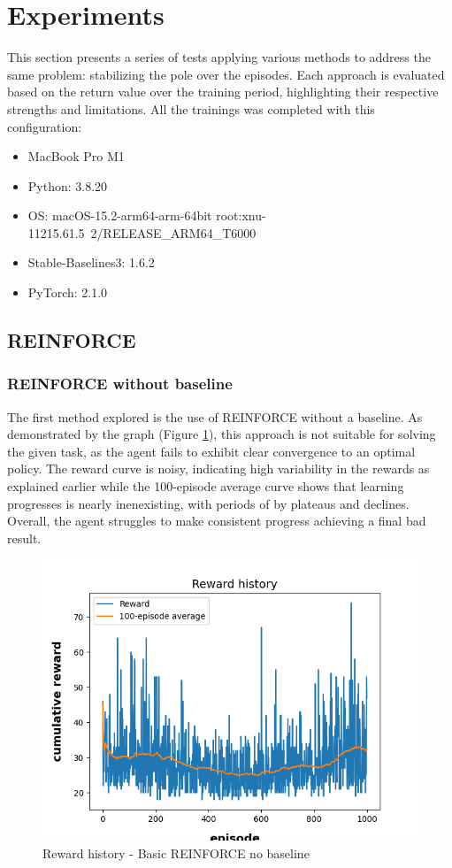 \documentclass{article}
\begin{document}
\section{Experiments}
This section presents a series of tests applying various methods to address the same problem: stabilizing the pole over the episodes. Each approach is evaluated based on the return value over the training period, highlighting their respective strengths and limitations. All the trainings was completed with this configuration:
\begin{itemize}
	\item MacBook Pro M1
	\item Python: 3.8.20
	\item OS: macOS-15.2-arm64-arm-64bit root:xnu-11215.61.5~2/RELEASE\_ARM64\_T6000
	\item Stable-Baselines3: 1.6.2
	\item PyTorch: 2.1.0
\end{itemize}

\subsection{REINFORCE}

\subsubsection{REINFORCE without baseline}
The first method explored is the use of REINFORCE without a baseline. As demonstrated by the graph (Figure \ref{fig:plot3}), this approach is not suitable for solving the given task, as the agent fails to exhibit clear convergence to an optimal policy. 
The reward curve is noisy, indicating high variability in the rewards as explained earlier while the 100-episode average curve shows that learning progresses is nearly inenexisting, with periods of by plateaus and declines. Overall, the agent struggles to make consistent progress achieving a final bad result.

\begin{figure}[h]
	\centering
	\includegraphics[width=0.5\linewidth]{../data/plot/reward_history_ContinuousCartPole-v0_0_basic.png}
	\caption{Reward history - Basic REINFORCE no baseline}
	\label{fig:plot3}
\end{figure}
\end{document}
